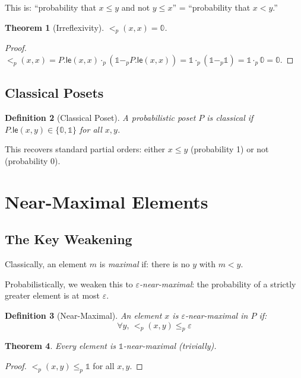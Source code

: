 \documentclass[11pt,a4paper]{article}
\newtheorem{theorem}{Theorem}[section]
\newtheorem{definition}[theorem]{Definition}
\newcommand{\pzero}{\mathbb{0}}
\newcommand{\pone}{\mathbb{1}}
\newcommand{\ple}{\leq_p}
\newcommand{\plt}{<_p}
\newcommand{\pmul}{\cdot_p}
\newcommand{\psub}{-_p}
\begin{document}
This is: ``probability that $x \leq y$ and not $y \leq x$'' = ``probability that $x < y$.''

\begin{theorem}[Irreflexivity]
$\plt(x, x) = \pzero$.
\end{theorem}

\begin{proof}
$\plt(x, x) = P.\mathsf{le}(x, x) \pmul (\pone \psub P.\mathsf{le}(x, x)) = \pone \pmul (\pone \psub \pone) = \pone \pmul \pzero = \pzero$.
\end{proof}

\subsection{Classical Posets}

\begin{definition}[Classical Poset]
A probabilistic poset $P$ is \emph{classical} if $P.\mathsf{le}(x, y) \in \{\pzero, \pone\}$ for all $x, y$.
\end{definition}

This recovers standard partial orders: either $x \leq y$ (probability 1) or not (probability 0).

\section{Near-Maximal Elements}

\subsection{The Key Weakening}

Classically, an element $m$ is \emph{maximal} if: there is no $y$ with $m < y$.

Probabilistically, we weaken this to \emph{$\varepsilon$-near-maximal}: the probability of a strictly greater element is at most $\varepsilon$.

\begin{definition}[Near-Maximal]
An element $x$ is \emph{$\varepsilon$-near-maximal} in $P$ if:
\[
\forall y,\, \plt(x, y) \ple \varepsilon
\]
\end{definition}

\begin{theorem}
Every element is $\pone$-near-maximal (trivially).
\end{theorem}

\begin{proof}
$\plt(x, y) \ple \pone$ for all $x, y$.
\end{proof}
\end{document}
